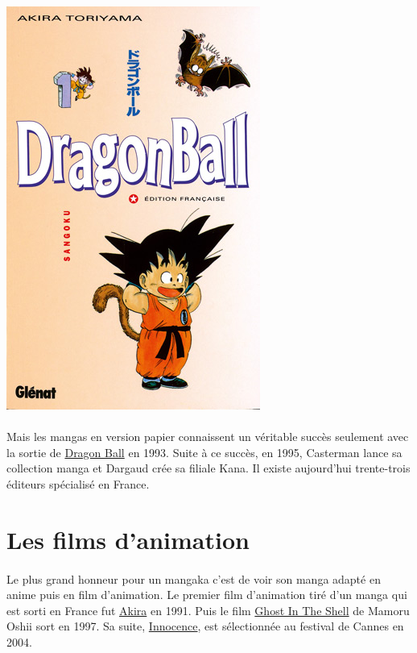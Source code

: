\begin{center}
	\includegraphics[scale=0.3]{dragonball.jpg}
\end{center}

\paragraph{} Mais les mangas en version papier connaissent un véritable succès
seulement avec la sortie de \underline{Dragon Ball} en 1993. Suite à ce succès,
en 1995, Casterman lance sa collection manga et Dargaud crée sa filiale Kana.
Il existe 	aujourd'hui trente-trois éditeurs spécialisé en France.

\section{Les films d'animation}

\paragraph{} Le plus grand honneur pour un mangaka c'est de voir son manga
adapté en anime puis en film d'animation. Le premier film d'animation tiré d'un
manga qui est sorti en France fut \underline{Akira} en 1991. Puis le film
\underline{Ghost In The Shell} de Mamoru Oshii sort en 1997. Sa suite,
\underline{Innocence}, est sélectionnée au festival de Cannes en 2004.

